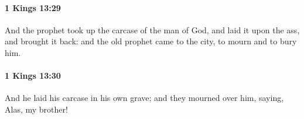 		\paragraph{1 Kings 13:29} %
			\label{1KINGS-13-29}

			And the prophet took up the carcase of the man of God, and laid it upon the ass, and brought it back: and the old prophet came to the city, to mourn and to bury him.


		\paragraph{1 Kings 13:30} %
			\label{1KINGS-13-30}

			And he laid his carcase in his own grave; and they mourned over him, saying, Alas, my brother!


